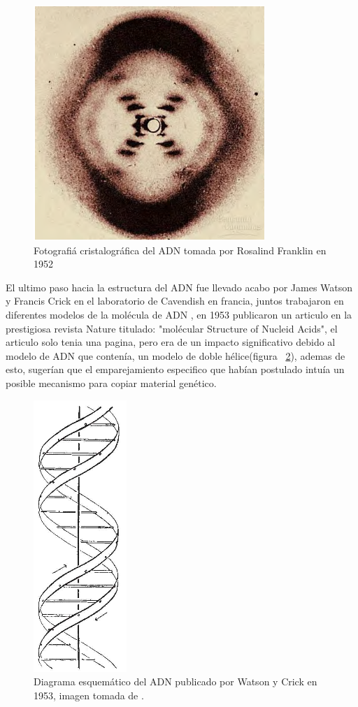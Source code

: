 \begin{figure}[htbp]
    \centering
    \includegraphics[width=0.5\linewidth]{./Figures/RF.png}
    \caption[Fotografía cristalográfica del ADN]{Fotografiá cristalográfica del ADN tomada por Rosalind Franklin en 1952}
    \label{fig:rf}
\end{figure}
El ultimo paso hacia la estructura del ADN fue llevado acabo por James Watson y Francis Crick en el laboratorio de Cavendish en francia, juntos trabajaron en diferentes modelos de la molécula de ADN , en 1953 publicaron un articulo en la prestigiosa revista Nature titulado: "molécular Structure of Nucleid Acids", el articulo solo tenia una pagina, pero era de un impacto significativo debido al modelo de ADN que contenía, un modelo de doble hélice(figura ~\ref{fig:jw}), ademas de esto, sugerían que el emparejamiento  especifico que habían postulado intuía un posible mecanismo para copiar material genético.
\begin{figure}[htbp]
    \centering
    \includegraphics[width=0.15\linewidth]{./Figures/DNA1.png}
    \caption[Diagrama esquemático del ADN]{Diagrama esquemático del ADN publicado por Watson y Crick en 1953, imagen tomada de \cite{jwfc}.}
    \label{fig:jw}
\end{figure}
